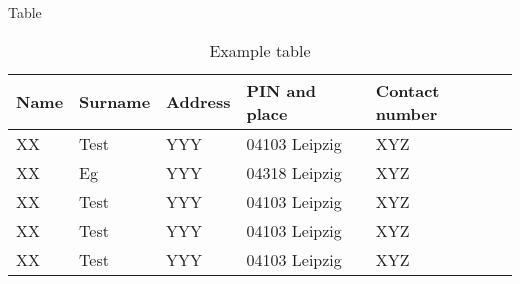 \begin{frame}{Table}
	\begin{table}
		\centering
        \begin{tabular}{lllll} 
			\hline
			Name & Surname & Address & PIN and place & Contact number \\ 
			\hline
			XX & Test & YYY & 04103 Leipzig & XYZ \\
			XX & Eg & YYY & 04318 Leipzig & XYZ \\
			XX & Test & YYY & 04103 Leipzig & XYZ \\
			XX & Test & YYY & 04103 Leipzig & XYZ \\
			XX & Test & YYY & 04103 Leipzig & XYZ \\
			\hline
		\end{tabular}
		\caption{Example table}
	\end{table}
\end{frame}